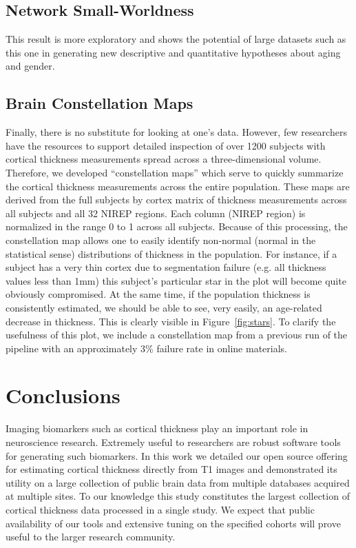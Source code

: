 \subsection{Network Small-Worldness}
This result is more exploratory and shows the potential of large
datasets such as this one in generating new descriptive and
quantitative hypotheses about aging and gender.  

\subsection{Brain Constellation Maps}
Finally, there is no substitute for looking at one's data.  However,
few researchers have the resources to support detailed 
inspection of over 1200 subjects with cortical thickness
measurements spread across a three-dimensional volume.  Therefore, we
developed ``constellation maps'' which serve to quickly summarize the
cortical thickness measurements across the entire population.   These
maps are derived from the full subjects by cortex %
matrix of thickness measurements
across all subjects and all 32 NIREP regions.  Each column (NIREP
region) is normalized in the range 0 to 1 across all subjects.
Because of this processing, the constellation map allows one to
easily identify non-normal (normal in the statistical sense)
distributions of thickness in the population.  For instance, if a
subject has a very thin cortex due to segmentation failure (e.g. all
thickness values less than 1mm) this subject's particular star
in the plot will become quite obviously compromised.  At the same
time, if the population thickness is consistently estimated, we should
be able to see, very easily, an age-related decrease in thickness.
This is clearly visible in Figure~\ref{fig:stars}.  To clarify the
usefulness of this plot, we include a constellation map from a
previous run of the pipeline with an approximately 3\% failure rate in
online materials. 

\section{Conclusions}

Imaging biomarkers such as cortical thickness play an 
important role in neuroscience research.  Extremely useful to
researchers are robust software tools for generating such 
biomarkers.  In this work we detailed our open source offering for estimating
cortical thickness directly from T1 images and demonstrated
its utility on a large collection of public brain data from
multiple databases acquired at multiple sites.  To our knowledge
this study constitutes the largest collection of cortical
thickness data processed in a single study.  
We expect that public availability of our tools and extensive tuning on 
the specified cohorts will prove useful to the larger
research community.  

